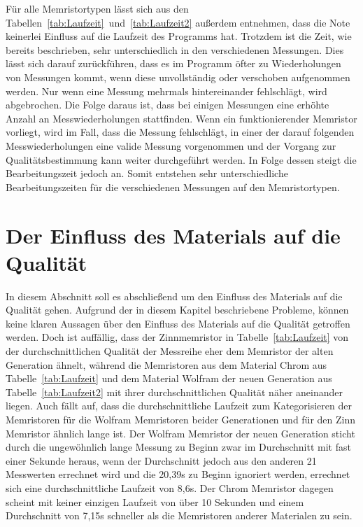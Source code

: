 Für alle Memristortypen lässt sich aus den Tabellen~\ref{tab:Laufzeit}~und~\ref{tab:Laufzeit2} außerdem entnehmen, dass die Note keinerlei Einfluss auf die Laufzeit des Programms hat. Trotzdem ist die Zeit, wie bereits beschrieben, sehr unterschiedlich in den verschiedenen Messungen. Dies lässt sich darauf zurückführen, dass es im Programm öfter zu Wiederholungen von Messungen kommt, wenn diese unvollständig oder verschoben aufgenommen werden. Nur wenn eine Messung mehrmals hintereinander fehlschlägt, wird abgebrochen. Die Folge daraus ist, dass bei einigen Messungen eine erhöhte Anzahl an Messwiederholungen stattfinden. Wenn ein funktionierender Memristor vorliegt, wird im Fall, dass die Messung fehlschlägt, in einer der darauf folgenden Messwiederholungen eine valide Messung vorgenommen und der Vorgang zur Qualitätsbestimmung kann weiter durchgeführt werden. In Folge dessen steigt die Bearbeitungszeit jedoch an. Somit entstehen sehr unterschiedliche Bearbeitungszeiten für die verschiedenen Messungen auf den Memristortypen.

\section{Der Einfluss des Materials auf die Qualität}
In diesem Abschnitt soll es abschließend um den Einfluss des Materials auf die Qualität gehen. Aufgrund der in diesem Kapitel beschriebene Probleme, können keine klaren Aussagen über den Einfluss des Materials auf die Qualität getroffen werden. Doch ist auffällig, dass der Zinnmemristor in Tabelle~\ref{tab:Laufzeit} von der durchschnittlichen Qualität der Messreihe eher dem Memristor der alten Generation ähnelt, während die Memristoren aus dem Material Chrom aus Tabelle~\ref{tab:Laufzeit} und dem Material Wolfram der neuen Generation aus Tabelle~\ref{tab:Laufzeit2} mit ihrer durchschnittlichen Qualität näher aneinander liegen. Auch fällt auf, dass die durchschnittliche Laufzeit zum Kategorisieren der Memristoren für die Wolfram Memristoren beider Generationen und für den Zinn Memristor ähnlich lange ist. Der Wolfram Memristor der neuen Generation sticht durch die ungewöhnlich lange Messung zu Beginn zwar im Durchschnitt mit fast einer Sekunde heraus, wenn der Durchschnitt jedoch aus den anderen 21 Messwerten errechnet wird und die 20,39s zu Beginn ignoriert werden, errechnet sich eine durchschnittliche Laufzeit von 8,6s. Der Chrom Memristor dagegen scheint mit keiner einzigen Laufzeit von über 10 Sekunden und einem Durchschnitt von 7,15s schneller als die Memristoren anderer Materialen zu sein.
